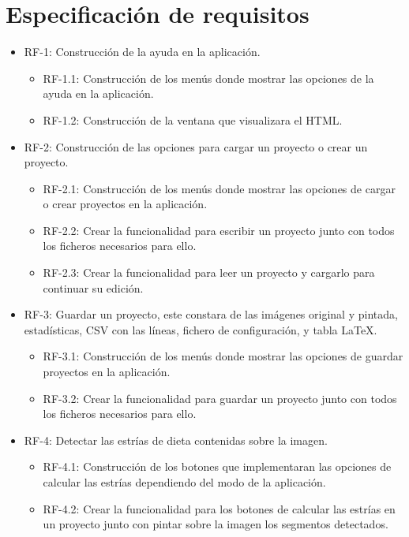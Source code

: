 \section{Especificación de requisitos}
\begin{itemize}
	 
\item RF-1: Construcción de la ayuda en la aplicación.
	\begin{itemize}
		\item RF-1.1: Construcción de los menús donde mostrar las opciones de la ayuda en la aplicación.
		\item RF-1.2: Construcción de la ventana que visualizara el HTML.
	\end{itemize}



\item RF-2: Construcción de las opciones para cargar un proyecto o crear un proyecto.
	\begin{itemize}
		\item RF-2.1: Construcción de los menús donde mostrar las opciones de cargar o crear proyectos en la aplicación. 
		\item RF-2.2: Crear la funcionalidad para escribir un proyecto junto con todos los ficheros necesarios para ello.
		\item RF-2.3: Crear la funcionalidad para leer un proyecto y cargarlo para continuar su edición.
	\end{itemize}

\item RF-3: Guardar un proyecto, este constara de las imágenes original y pintada, estadísticas, CSV con las líneas, fichero de configuración, y tabla \LaTeX .
	\begin{itemize}
		\item RF-3.1: Construcción de los menús donde mostrar las opciones de guardar proyectos en la aplicación. 
		\item RF-3.2: Crear la funcionalidad para guardar un proyecto junto con todos los ficheros necesarios para ello.
	\end{itemize}

\item RF-4: Detectar las estrías de dieta contenidas sobre la imagen.
	\begin{itemize}
		\item RF-4.1: Construcción de los botones que implementaran las opciones de calcular las estrías dependiendo del modo de la aplicación. 
		\item RF-4.2: Crear la funcionalidad para los botones de calcular las estrías en un proyecto junto con pintar sobre la imagen los segmentos detectados.
	\end{itemize}
	

\end{itemize}
